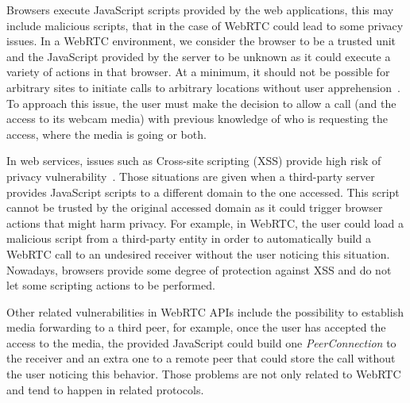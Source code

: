 Browsers execute JavaScript scripts provided by the web applications, this may include malicious scripts, that in the case of WebRTC could lead to some privacy issues. In a WebRTC environment, we consider the browser to be a trusted unit and the JavaScript provided by the server to be unknown as it could execute a variety of actions in that browser. At a minimum, it should not be possible for arbitrary sites to initiate calls to arbitrary locations without user apprehension~\cite{rtcwebSecurityIETF}. To approach this issue, the user must make the decision to allow a call (and the access to its webcam media) with previous knowledge of who is requesting the access, where the media is going or both.


In web services, issues such as Cross-site scripting (XSS)  provide high risk of privacy vulnerability~\cite{crosssitescripting}. Those situations are given when a third-party server provides JavaScript scripts to a different domain to the one accessed. This script cannot be trusted by the original accessed domain as it could trigger browser actions that might harm privacy. For example, in WebRTC, the user could load a malicious script from a third-party entity in order to automatically build a WebRTC call to an undesired receiver without the user noticing this situation. Nowadays, browsers provide some degree of protection against XSS and do not let some scripting actions to be performed.

Other related vulnerabilities in WebRTC APIs include the possibility to establish media forwarding to a third peer, for example, once the user has accepted the access to the media, the provided JavaScript could build one {\it PeerConnection} to the receiver and an extra one to a remote peer that could store the call without the user noticing this behavior. Those problems are not only related to WebRTC and tend to happen in related protocols.

